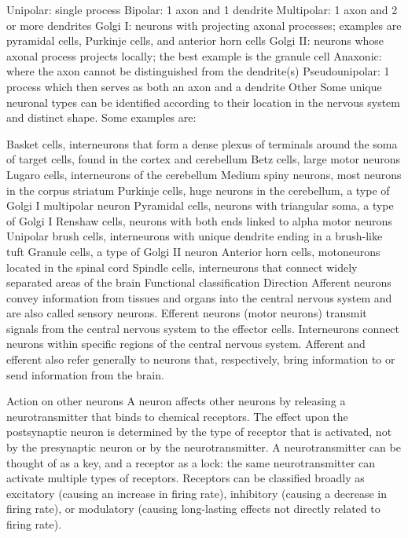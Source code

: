 Unipolar: single process
Bipolar: 1 axon and 1 dendrite
Multipolar: 1 axon and 2 or more dendrites
Golgi I: neurons with projecting axonal processes; examples are pyramidal cells, Purkinje cells, and anterior horn cells
Golgi II: neurons whose axonal process projects locally; the best example is the granule cell
Anaxonic: where the axon cannot be distinguished from the dendrite(s)
Pseudounipolar: 1 process which then serves as both an axon and a dendrite
Other
Some unique neuronal types can be identified according to their location in the nervous system and distinct shape. Some examples are:

Basket cells, interneurons that form a dense plexus of terminals around the soma of target cells, found in the cortex and cerebellum
Betz cells, large motor neurons
Lugaro cells, interneurons of the cerebellum
Medium spiny neurons, most neurons in the corpus striatum
Purkinje cells, huge neurons in the cerebellum, a type of Golgi I multipolar neuron
Pyramidal cells, neurons with triangular soma, a type of Golgi I
Renshaw cells, neurons with both ends linked to alpha motor neurons
Unipolar brush cells, interneurons with unique dendrite ending in a brush-like tuft
Granule cells, a type of Golgi II neuron
Anterior horn cells, motoneurons located in the spinal cord
Spindle cells, interneurons that connect widely separated areas of the brain
Functional classification
Direction
Afferent neurons convey information from tissues and organs into the central nervous system and are also called sensory neurons.
Efferent neurons (motor neurons) transmit signals from the central nervous system to the effector cells.
Interneurons connect neurons within specific regions of the central nervous system.
Afferent and efferent also refer generally to neurons that, respectively, bring information to or send information from the brain.

Action on other neurons
A neuron affects other neurons by releasing a neurotransmitter that binds to chemical receptors. The effect upon the postsynaptic neuron is determined by the type of receptor that is activated, not by the presynaptic neuron or by the neurotransmitter. A neurotransmitter can be thought of as a key, and a receptor as a lock: the same neurotransmitter can activate multiple types of receptors. Receptors can be classified broadly as excitatory (causing an increase in firing rate), inhibitory (causing a decrease in firing rate), or modulatory (causing long-lasting effects not directly related to firing rate).

